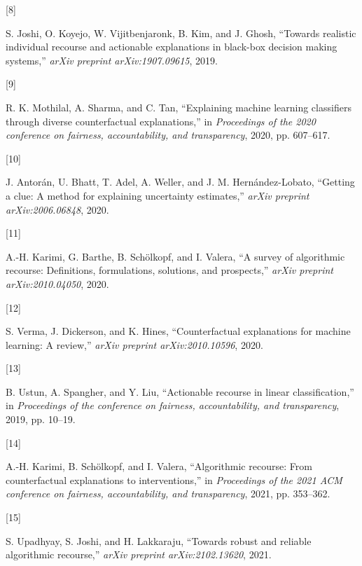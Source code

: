 \documentclass[
  conference]{IEEEtran}
\newlength{\cslhangindent}
\newlength{\csllabelwidth}
\newlength{\cslentryspacingunit} %
\newenvironment{CSLReferences}[2] %
 {%
  \setlength{\parindent}{0pt}
  \ifodd #1
  \let\oldpar\par
  \def\par{\hangindent=\cslhangindent\oldpar}
  \fi
  \setlength{\parskip}{#2\cslentryspacingunit}
 }%
 {}
\newcommand{\CSLLeftMargin}[1]{\parbox[t]{\csllabelwidth}{#1}}
\newcommand{\CSLRightInline}[1]{\parbox[t]{\linewidth - \csllabelwidth}{#1}\break}
\begin{document}
\begin{CSLReferences}{0}{0}
\leavevmode{}%
\CSLLeftMargin{{[}8{]} }%
\CSLRightInline{S. Joshi, O. Koyejo, W. Vijitbenjaronk, B. Kim, and J.
Ghosh, {``Towards realistic individual recourse and actionable
explanations in black-box decision making systems,''} \emph{arXiv
preprint arXiv:1907.09615}, 2019.}

\leavevmode{}%
\CSLLeftMargin{{[}9{]} }%
\CSLRightInline{R. K. Mothilal, A. Sharma, and C. Tan, {``Explaining
machine learning classifiers through diverse counterfactual
explanations,''} in \emph{Proceedings of the 2020 conference on
fairness, accountability, and transparency}, 2020, pp. 607--617.}

\leavevmode{}%
\CSLLeftMargin{{[}10{]} }%
\CSLRightInline{J. Antorán, U. Bhatt, T. Adel, A. Weller, and J. M.
Hernández-Lobato, {``Getting a clue: A method for explaining uncertainty
estimates,''} \emph{arXiv preprint arXiv:2006.06848}, 2020.}

\leavevmode{}%
\CSLLeftMargin{{[}11{]} }%
\CSLRightInline{A.-H. Karimi, G. Barthe, B. Schölkopf, and I. Valera,
{``A survey of algorithmic recourse: Definitions, formulations,
solutions, and prospects,''} \emph{arXiv preprint arXiv:2010.04050},
2020.}

\leavevmode{}%
\CSLLeftMargin{{[}12{]} }%
\CSLRightInline{S. Verma, J. Dickerson, and K. Hines, {``Counterfactual
explanations for machine learning: A review,''} \emph{arXiv preprint
arXiv:2010.10596}, 2020.}

\leavevmode{}%
\CSLLeftMargin{{[}13{]} }%
\CSLRightInline{B. Ustun, A. Spangher, and Y. Liu, {``Actionable
recourse in linear classification,''} in \emph{Proceedings of the
conference on fairness, accountability, and transparency}, 2019, pp.
10--19.}

\leavevmode{}%
\CSLLeftMargin{{[}14{]} }%
\CSLRightInline{A.-H. Karimi, B. Schölkopf, and I. Valera,
{``Algorithmic recourse: From counterfactual explanations to
interventions,''} in \emph{Proceedings of the 2021 ACM conference on
fairness, accountability, and transparency}, 2021, pp. 353--362.}

\leavevmode{}%
\CSLLeftMargin{{[}15{]} }%
\CSLRightInline{S. Upadhyay, S. Joshi, and H. Lakkaraju, {``Towards
robust and reliable algorithmic recourse,''} \emph{arXiv preprint
arXiv:2102.13620}, 2021.}


\end{CSLReferences}
\end{document}
